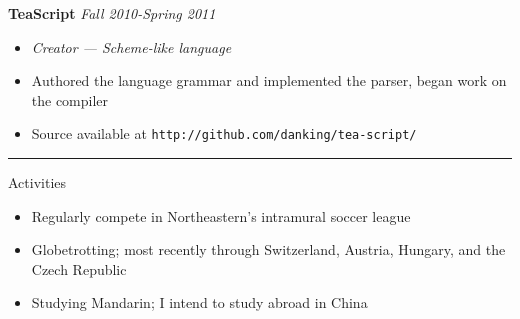 \documentclass[10pt]{letter}
\begin{document}
\begin{tabbing}
{\large \bf TeaScript} \` \textit{Fall 2010-Spring 2011}
\end{tabbing}

\begin{itemize}
\setlength\itemsep{1pt}
\item [] {\textit{Creator --- Scheme-like language}}
\item{Authored the language grammar and implemented the parser, began work on
  the compiler}
\item{Source available at \texttt{http://github.com/danking/tea-script/}}
\end{itemize}

\rule{\linewidth}{.5pt}

{\Large Activities}
\begin{itemize}
\setlength\itemsep{1pt}
\item{Regularly compete in Northeastern's intramural soccer league}
\item{Globetrotting; most recently through Switzerland, Austria, Hungary, and
  the Czech Republic}
\item{Studying Mandarin; I intend to study abroad in China}
\end{itemize} 
\end{document}
